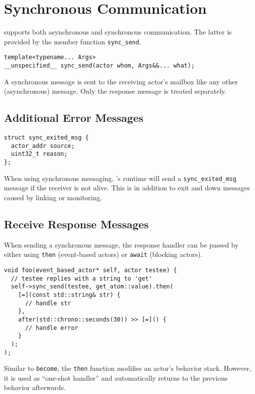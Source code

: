 \section{Synchronous Communication}
\label{Sec::Sync}

\lib supports both asynchronous and synchronous communication. The latter is provided by the member function \lstinline^sync_send^.

\begin{lstlisting}
template<typename... Args>
__unspecified__ sync_send(actor whom, Args&&... what);
\end{lstlisting}

A synchronous message is sent to the receiving actor's mailbox like any other (asynchronous) message. Only the response message is treated separately.

\subsection{Additional Error Messages}

\begin{lstlisting}
struct sync_exited_msg {
  actor_addr source;
  uint32_t reason;
};
\end{lstlisting}

When using synchronous messaging, \lib's runtime will send a \lstinline^sync_exited_msg^ message if the receiver is not alive. This is in addition to exit and down messages caused by linking or monitoring.

\subsection{Receive Response Messages}

When sending a synchronous message, the response handler can be passed by either using \lstinline^then^ (event-based actors) or \lstinline^await^ (blocking actors).

\begin{lstlisting}
void foo(event_based_actor* self, actor testee) {
  // testee replies with a string to 'get'
  self->sync_send(testee, get_atom::value).then(
    [=](const std::string& str) {
      // handle str
    },
    after(std::chrono::seconds(30)) >> [=]() {
      // handle error
    }
  );
);
\end{lstlisting}

Similar to \lstinline^become^, the \lstinline^then^ function modifies an actor's behavior stack.
However, it is used as ``one-shot handler'' and automatically returns to the previous behavior afterwards.


